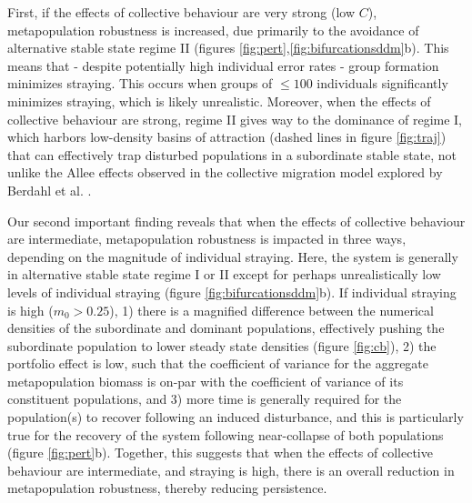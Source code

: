\documentclass{revtex4}
\begin{document}
First, if the effects of collective behaviour are very strong (low $C$), metapopulation robustness is increased, due primarily to the avoidance of alternative stable state regime II (figures \ref{fig:pert},\ref{fig:bifurcationsddm}b).
This means that - despite potentially high individual error rates - group formation minimizes straying. 
This occurs when groups of $\leq 100$ individuals significantly minimizes straying, which is likely unrealistic.
Moreover, when the effects of collective behaviour are strong, regime II gives way to the dominance of regime I, which harbors low-density basins of attraction (dashed lines in figure \ref{fig:traj}) that can effectively trap disturbed populations in a subordinate stable state, not unlike the Allee effects observed in the collective migration model explored by Berdahl et al. \citep{Berdahl:2016dx}.


Our second important finding reveals that when the effects of collective behaviour are intermediate, metapopulation robustness is impacted in three ways, depending on the magnitude of individual straying.
Here, the system is generally in alternative stable state regime I or II except for perhaps unrealistically low levels of individual straying (figure \ref{fig:bifurcationsddm}b).
If individual straying is high ($m_0>0.25$),
1) there is a magnified difference between the numerical densities of the subordinate and dominant populations, effectively pushing the subordinate population to lower steady state densities (figure \ref{fig:cb}),
2) the portfolio effect is low, such that the coefficient of variance for the aggregate metapopulation biomass is on-par with the coefficient of variance of its constituent populations, and
3) more time is generally required for the population(s) to recover following an induced disturbance, and this is particularly true for the recovery of the system following near-collapse of both populations (figure \ref{fig:pert}b).
Together, this suggests that when the effects of collective behaviour are intermediate, and straying is high, there is an overall reduction in metapopulation robustness, thereby reducing persistence.
\end{document}
